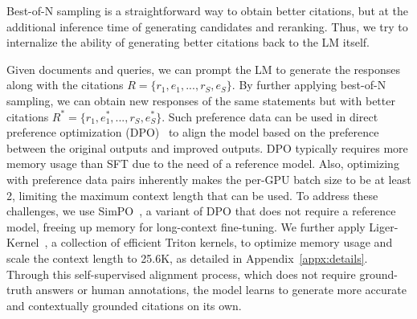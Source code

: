 Best-of-N sampling is a straightforward way to obtain better citations, but at the additional inference time of generating candidates and reranking. Thus, we try to internalize the ability of generating better citations back to the LM itself.

Given documents and queries, we can prompt the LM to generate the responses along with the citations $R = \{r_1, e_1, ..., r_{S}, e_{S}\}$. By further applying best-of-N sampling, we can obtain new responses of the same statements but with better citations $R^* = \{r_1, e^*_1, ..., r_{S}, e^*_{S}\}$. Such preference data can be used in direct preference optimization (DPO)~\citep{rafailov2024direct} to align the model based on the preference between the original outputs and improved outputs.
DPO typically requires more memory usage than SFT due to the need of a reference model. Also, optimizing with preference data pairs inherently makes the per-GPU batch size to be at least 2, limiting the maximum context length that can be used.
To address these challenges, we use SimPO~\citep{meng2024simpo}, a variant of DPO that does not require a reference model, freeing up memory for long-context fine-tuning.
We further apply Liger-Kernel~\citep{hsu2024ligerkernelefficienttriton}, a collection of efficient Triton kernels, to optimize memory usage and scale the context length to 25.6K, as detailed in Appendix~\ref{appx:details}.
Through this self-supervised alignment process, which does not require ground-truth answers or human annotations, the model learns to generate more accurate and contextually grounded citations on its own.
